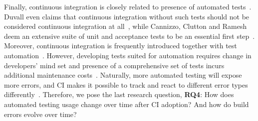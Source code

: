 Finally, continuous integration is closely related to presence of automated tests~\cite{Fowler}. 
Duvall even claims that continuous integration without such tests should not be considered continuous integration 
at all~\cite{Duvall}, while Cannizzo, Clutton and Ramesh deem an extensive suite of unit and acceptance tests to 
be an essential first step~\cite{CannizzoCluttonRamesh}. 
Moreover, continuous integration is frequently introduced together with test automation~\cite{Yuksel}.
However, developing tests suited for automation requires change in developers' mind set and presence of a  comprehensive set of tests incurs additional maintenance costs~\cite{CoramBohner}.
Naturally, more automated testing will expose more errors, and CI makes it possible to track and react to different error types differently~\cite{BellerGZ16}.
Therefore, we pose the last research question,  \textbf{RQ4}: How does automated testing usage change over time after CI adoption? And how do build errors evolve over time? %

